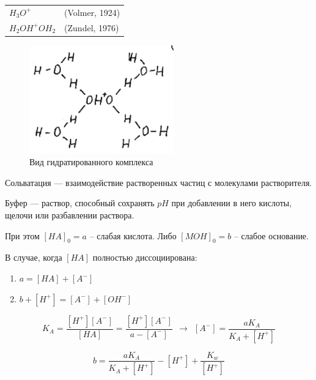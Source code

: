 \begin{lecture}
\begin{lecSection}
	\begin{tabular}{ll}
		$ H_3O^+ $ & (Volmer, 1924) \\
		$ H_2 OH^+ OH_2 $ & (Zundel, 1976)
	\end{tabular}

	\begin{figure}[h]
		\centering
		\includegraphics[width=0.4\linewidth]{lecture_04/new_k_molec}
		\caption[Вид гидратированного комплекса]{Вид гидратированного комплекса}
		\label{fig:kmolec}
	\end{figure}

	\begin{definition}
		Сольватация --- взаимодействие растворенных частиц с молекулами растворителя.
	\end{definition}
\end{lecSection}

	\begin{lecSection}
		\begin{definition}
			Буфер --- раствор, способный сохранять $ pH $ при добавлении в него кислоты, щелочи или разбавлении раствора.
		\end{definition}
	При этом $ [HA]_0 = a $ -- слабая кислота. Либо $ [MOH]_0 = b $ -- слабое основание.
	
	В случае, когда $ [HA] $ полностью диссоциирована:
	\begin{enumerate}
		\item $ a = [HA] + [A^-] $
		\item $ b + [H^+] = [A^-] + [OH^-] $
	\end{enumerate}

	\begin{equation*}
		K_A = \dfrac{[H^+] [A^-]}{[HA]} = 
		\dfrac{[H^+] [A^-]}{a - [A^-]} ~~ \rightarrow ~~ 
		[A^-] = \dfrac{a K_A}{K_A + [H^+]}
	\end{equation*}
	
	\begin{equation}
	\boxed{
		b = \dfrac{a K_A}{K_A + [H^+]} - [H^+] + \dfrac{ K_w }{ [H^+] }
	}
	\label{eq:b_in_buffer}
	\end{equation}
	\end{lecSection}
	
\end{lecture}
